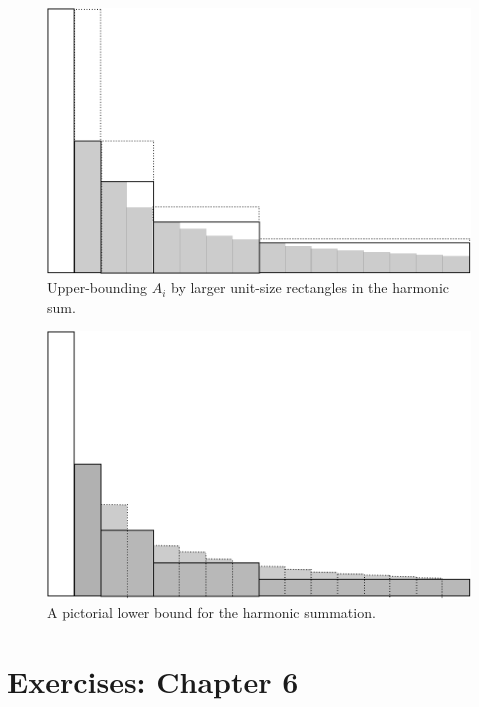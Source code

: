 \begin{figure}[htb]
\centerline{
\includegraphics[scale=0.25]{FiguresMaths/HarmonicSumUpperbound}
}
\caption{Upper-bounding $A_i$ by larger unit-size rectangles in the harmonic sum.}
\label{fig:HarmonicSumUpperbound}
\end{figure}

\begin{figure}[htb]
\centerline{
\includegraphics[scale=0.25]{FiguresMaths/HarmonicSumLowerbound}
}
\caption{A pictorial lower bound for the harmonic summation.}
\label{fig:HarmonicSumLowerbound}
\end{figure}




\section{Exercises: Chapter 6}

